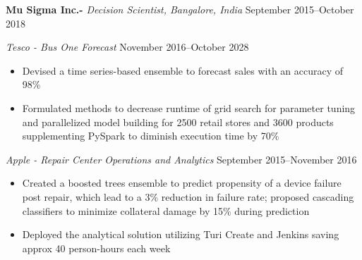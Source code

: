 \textbf{Mu Sigma Inc.-} \textit{Decision Scientist, Bangalore, India} \hfill September 2015--October 2018\par

	\textit{Tesco - Bus One Forecast} \hfill November 2016--October 2028
\begin{itemize}
	\item Devised a time series-based ensemble to forecast sales with an accuracy of 98\%
	\item Formulated methods to decrease runtime of grid search for parameter tuning and parallelized model building for 2500 retail stores and 3600 products supplementing PySpark to diminish execution time by 70\%
\end{itemize}\par

\textit{Apple - Repair Center Operations and Analytics} \hfill September 2015--November 2016
\begin{itemize}
	\item Created a boosted trees ensemble to predict propensity of a device failure post repair, which lead to a 3\% reduction in failure rate; proposed cascading classifiers to minimize collateral damage by 15\% during prediction
	\item  Deployed the analytical solution utilizing Turi Create and Jenkins saving approx 40 person-hours each week
\end{itemize}\par